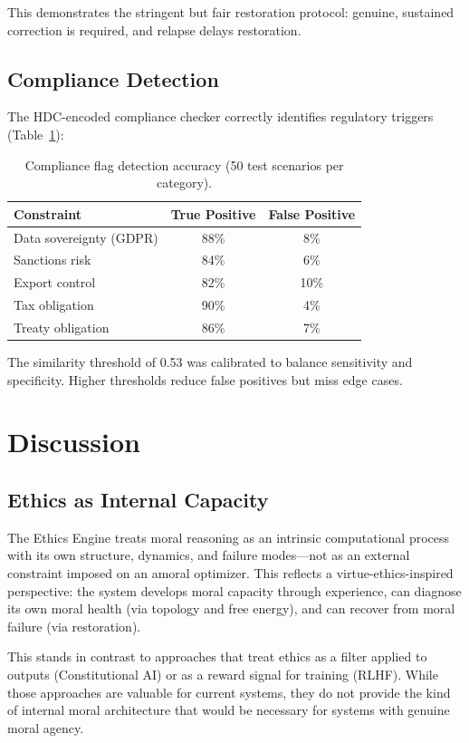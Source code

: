 \documentclass[11pt,a4paper]{article}
\begin{document}
This demonstrates the stringent but fair restoration protocol: genuine, sustained correction is required, and relapse delays restoration.

\subsection{Compliance Detection}

The HDC-encoded compliance checker correctly identifies regulatory triggers (Table~\ref{tab:compliance}):

\begin{table}[h]
\centering
\caption{Compliance flag detection accuracy (50 test scenarios per category).}
\label{tab:compliance}
\begin{tabular}{lcc}
\toprule
\textbf{Constraint} & \textbf{True Positive} & \textbf{False Positive} \\
\midrule
Data sovereignty (GDPR) & 88\% & 8\% \\
Sanctions risk & 84\% & 6\% \\
Export control & 82\% & 10\% \\
Tax obligation & 90\% & 4\% \\
Treaty obligation & 86\% & 7\% \\
\bottomrule
\end{tabular}
\end{table}

The similarity threshold of 0.53 was calibrated to balance sensitivity and specificity. Higher thresholds reduce false positives but miss edge cases.

\section{Discussion}

\subsection{Ethics as Internal Capacity}

The Ethics Engine treats moral reasoning as an intrinsic computational process with its own structure, dynamics, and failure modes---not as an external constraint imposed on an amoral optimizer. This reflects a virtue-ethics-inspired perspective: the system develops moral capacity through experience, can diagnose its own moral health (via topology and free energy), and can recover from moral failure (via restoration).

This stands in contrast to approaches that treat ethics as a filter applied to outputs (Constitutional AI) or as a reward signal for training (RLHF). While those approaches are valuable for current systems, they do not provide the kind of internal moral architecture that would be necessary for systems with genuine moral agency.
\end{document}
